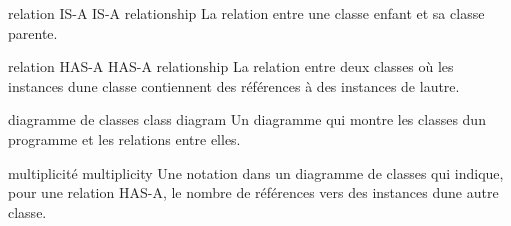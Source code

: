 relation IS-A IS-A relationship La relation entre une classe enfant et
sa classe parente.

relation HAS-A HAS-A relationship La relation entre deux classes où les
instances d\textquotesingle une classe contiennent des références à des
instances de l\textquotesingle autre.

diagramme de classes class diagram Un diagramme qui montre les classes
d\textquotesingle un programme et les relations entre elles.

multiplicité multiplicity Une notation dans un diagramme de classes qui
indique, pour une relation HAS-A, le nombre de références vers des
instances d\textquotesingle une autre classe.
